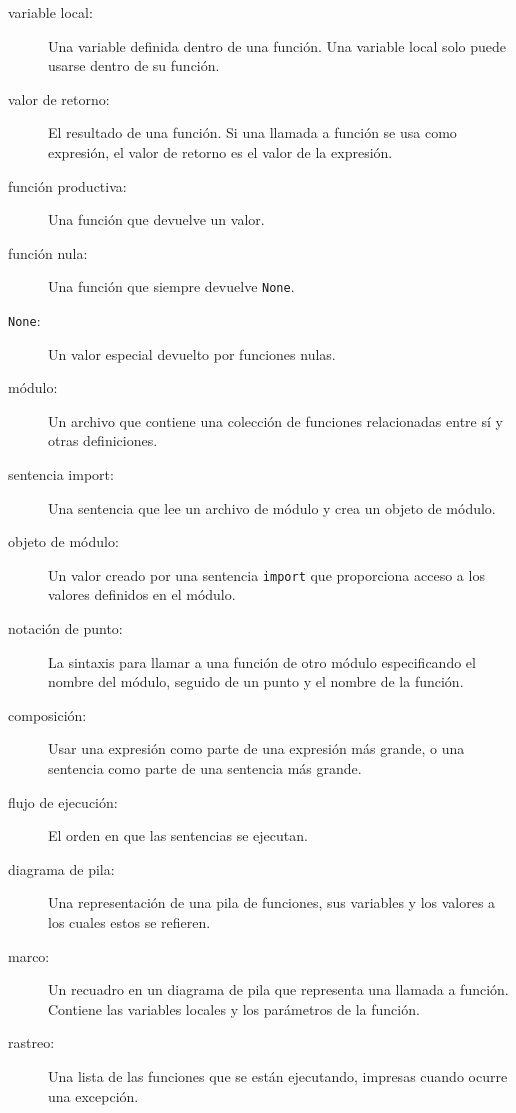 \documentclass[10pt]{book}
\begin{document}
\begin{description}
\item[variable local:]  Una variable definida dentro de una función. Una variable
local solo puede usarse dentro de su función.

\item[valor de retorno:]  El resultado de una función.  Si una llamada a función
se usa como expresión, el valor de retorno es el valor de
la expresión.

\item[función productiva:] Una función que devuelve un valor.

\item[función nula:] Una función que siempre devuelve {\tt None}.

\item[{\tt None}:]  Un valor especial devuelto por funciones nulas.

\item[módulo:] Un archivo que contiene una
colección de funciones relacionadas entre sí y otras definiciones.

\item[sentencia import:] Una sentencia que lee un archivo de módulo y crea
un objeto de módulo.

\item[objeto de módulo:] Un valor creado por una sentencia {\tt import}
que proporciona acceso a los valores definidos en el módulo.

\item[notación de punto:]  La sintaxis para llamar a una función de otro
módulo especificando el nombre del módulo, seguido de un punto y
el nombre de la función.

\item[composición:] Usar una expresión como parte de una expresión más grande,
o una sentencia como parte de una sentencia más grande.

\item[flujo de ejecución:]  El orden en que las sentencias se ejecutan.

\item[diagrama de pila:]  Una representación de una pila de funciones,
sus variables y los valores a los cuales estos se refieren.

\item[marco:]  Un recuadro en un diagrama de pila que representa una llamada a función.
Contiene las variables locales y los parámetros de la función.

\item[rastreo:]  Una lista de las funciones que se están ejecutando,
impresas cuando ocurre una excepción.


\end{description}
\end{document}
